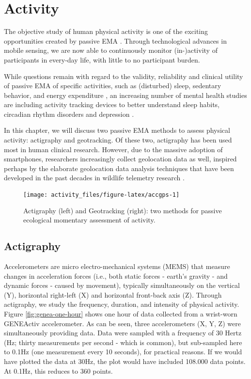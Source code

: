 \documentclass[]{book}
\begin{document}
\chapter{Activity}\label{activity}

The objective study of human physical activity is one of the exciting
opportunities created by passive EMA \citep{Marszalek2014}. Through
technological advances in mobile sensing, we are now able to
continuously monitor (in-)activity of participants in every-day life,
with little to no participant burden.

While questions remain with regard to the validity, reliability and
clinical utility of passive EMA of specific activities, such as
(disturbed) sleep, sedentary behavior, and energy expenditure
\citep[see, e.g.,][]{Feehan2018, Gomersall2016}, an increasing number of
mental health studies are including activity tracking devices to better
understand sleep habits, circadian rhythm disorders and depression
\citep[see, e.g.,][]{Saeb2015, Saunders2016, Tahmasian2013}.

In this chapter, we will discuss two passive EMA methods to assess
physical activity: actigraphy and geotracking. Of these two, actigraphy
has been used most in human clinical research. However, due to the
massive adoption of smartphones, researchers increasingly collect
geolocation data as well, inspired perhaps by the elaborate geolocation
data analysis techniques that have been developed in the past decades in
wildlife telemetry research \citep{tomkiewicz2010global}.

\begin{figure}

{\centering \texttt{[image: activity\_files/figure-latex/accgps-1]} 

}

\caption{Actigraphy (left) and Geotracking (right): two methods for passive ecological momentary assessment of activity.}\label{fig:accgps}
\end{figure}

\section{Actigraphy}\label{actigraphy}

 

Accelerometers are micro electro-mechanical systems (MEMS) that measure
changes in acceleration forces (i.e., both static forces - earth's
gravity - and dynamic forces - caused by movement), typically
simultaneously on the vertical (Y), horizontal right-left (X) and
horizontal front-back axis (Z). Through actigraphy, we study the
frequency, duration, and intensity of physical activity. Figure
\ref{fig:genea-one-hour} shows one hour of data collected from a
wrist-worn GENEActiv accelerometer. As can be seen, three accelerometers
(X, Y, Z) were simultaneously providing data. Data were sampled with a
frequency of 30 Hertz (Hz; thirty measurements per second - which is
common), but sub-sampled here to 0.1Hz (one measurement every 10
seconds), for practical reasons. If we would have plotted the data at
30Hz, the plot would have included 108.000 data points. At 0.1Hz, this
reduces to 360 points.
\end{document}
